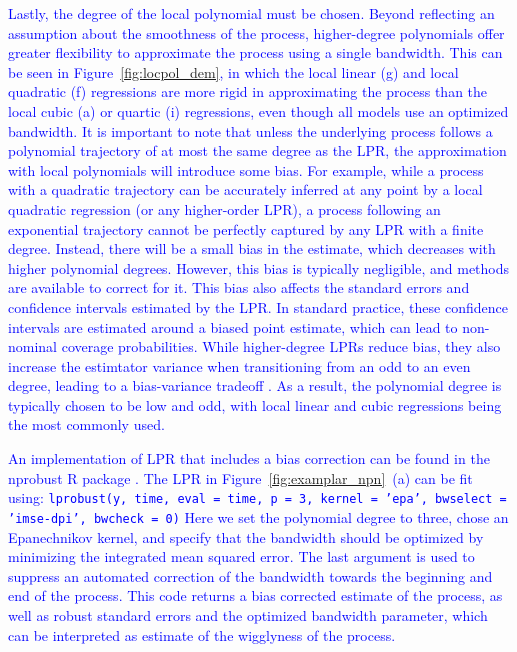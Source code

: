 \documentclass[man, floatsintext]{apa7}
\begin{document}
\textcolor{blue}{
  Lastly, the degree of the local polynomial must be chosen. Beyond reflecting
  an assumption about the smoothness of the process, higher-degree polynomials
  offer greater flexibility to approximate the process using a single
  bandwidth. This can be seen in Figure~\ref{fig:locpol_dem}, in which the
  local linear (g) and local quadratic (f) regressions are more rigid in
  approximating the process than the local cubic (a) or quartic (i)
  regressions, even though all models use an optimized bandwidth. It is
  important to note that unless the underlying process follows a polynomial
  trajectory of at most the same degree as the LPR, the approximation with
  local polynomials will introduce some bias. For example, while a process with
  a quadratic trajectory can be accurately inferred at any point by a local
  quadratic regression (or any higher-order LPR), a process following an
  exponential trajectory cannot be perfectly captured by any LPR with a finite
  degree. Instead, there will be a small bias in the estimate, which decreases
  with higher polynomial degrees. However, this bias is typically negligible,
  and methods are available to correct for it. This bias also affects the
  standard errors and confidence intervals estimated by the LPR\@. In standard
  practice, these confidence intervals are estimated around a biased point
  estimate, which can lead to non-nominal coverage probabilities. While
  higher-degree LPRs reduce bias, they also increase the estimtator variance
  when transitioning from an odd to an even degree, leading to a bias-variance
  tradeoff \parencite{ruppert_multivariate_1994}. As a result, the polynomial
  degree is typically chosen to be low and odd, with local linear and cubic
  regressions being the most commonly used.
}

\textcolor{blue}{
An implementation of LPR that includes a bias correction can be found in the
nprobust R package \parencite{R-nprobust}. The LPR in
Figure~\ref{fig:examplar_npn}~(a) can be fit using:
{\fontsize{10}{12}\selectfont\texttt{lprobust(y, time, eval = time, p = 3,
  kernel = 'epa', bwselect = 'imse-dpi', bwcheck = 0)}} Here we set the
polynomial degree to three, chose an Epanechnikov kernel, and specify that the
bandwidth should be optimized by minimizing the integrated mean squared error.
The last argument is used to suppress an automated correction of the bandwidth
towards the beginning and end of the process. This code returns a bias
corrected estimate of the process, as well as robust standard errors and the
optimized bandwidth parameter, which can be interpreted as estimate of the
wigglyness of the process.
}
\end{document}
